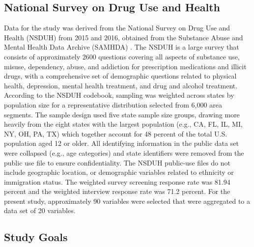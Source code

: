 \documentclass[sigconf]{acmart}
\begin{document}

\subsection{National Survey on Drug Use and Health} 

Data for the study was derived from the National Survey on Drug Use and Health 
(NSDUH) from 2015 and 2016, obtained from the Substance Abuse and Mental Health 
Data Archive (SAMHDA) \cite{samhsa16}. The NSDUH is a large survey that consists
of approximately 2600 questions covering all aspects of substance use, misuse, 
dependency, abuse, and addiction for prescription medications and illicit drugs, 
with a comprehensive set of demographic questions related to physical health, 
depression, mental health treatment, and drug and alcohol treatment. According 
to the NSDUH codebook, sampling was weighted across states by population size 
for a representative distribution selected from 6,000 area segments. The sample 
design used five state sample size groups, drawing more heavily from the eight 
states with the largest population (e.g., CA, FL, IL, MI, NY, OH, PA, TX) which 
together account for 48 percent of the total U.S. population aged 12 or older.  
All identifying information in the public data set were collapsed (e.g., age 
categories) and state identifiers were removed from the public use file to 
ensure confidentiality. The NSDUH public-use files do not include geographic 
location, or demographic variables related to ethnicity or immigration status. 
The weighted survey screening response rate was 81.94 percent and the weighted 
interview response rate was 71.2 percent. For the present study, approximately
90 variables were selected that were aggregated to a data set of 20 variables. 


\subsection{Study Goals} 
\end{document}

